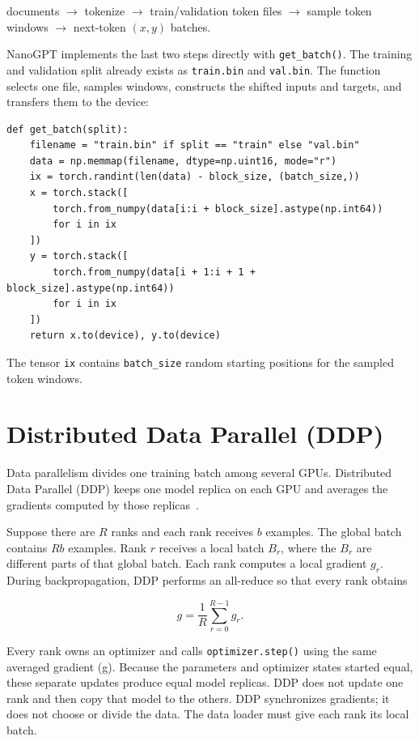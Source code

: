 \documentclass[11pt]{article}
\begin{document}
\begin{center}
documents $\longrightarrow$ tokenize
$\longrightarrow$ train/validation token files
$\longrightarrow$ sample token windows
$\longrightarrow$ next-token $(x,y)$ batches.
\end{center}

NanoGPT implements the last two steps directly with \texttt{get\_batch()}.
The training and validation split already exists as \texttt{train.bin} and
\texttt{val.bin}. The function selects one file, samples windows, constructs
the shifted inputs and targets, and transfers them to the device:

\begin{lstlisting}[basicstyle=\ttfamily\footnotesize]
def get_batch(split):
    filename = "train.bin" if split == "train" else "val.bin"
    data = np.memmap(filename, dtype=np.uint16, mode="r")
    ix = torch.randint(len(data) - block_size, (batch_size,))
    x = torch.stack([
        torch.from_numpy(data[i:i + block_size].astype(np.int64))
        for i in ix
    ])
    y = torch.stack([
        torch.from_numpy(data[i + 1:i + 1 + block_size].astype(np.int64))
        for i in ix
    ])
    return x.to(device), y.to(device)
\end{lstlisting}

The tensor \texttt{ix} contains \texttt{batch\_size} random starting positions
for the sampled token windows.

\newpage
\section{Distributed Data Parallel (DDP)}

Data parallelism divides one training batch among several GPUs. Distributed
Data Parallel (DDP) keeps one model replica on each GPU and averages the
gradients computed by those replicas~\cite{li2020pytorchdistributed}.

Suppose there are $R$ ranks and each rank receives $b$ examples. The
global batch contains $Rb$ examples. Rank $r$ receives a local batch
$B_r$, where the $B_r$ are different parts of that global batch. Each rank
computes a local gradient $g_r$. During backpropagation, DDP performs an
all-reduce so that every rank obtains

\[
g = \frac{1}{R}\sum_{r=0}^{R-1} g_r.
\]

Every rank owns an optimizer and calls \texttt{optimizer.step()} using the
same averaged gradient (g). Because the parameters and optimizer states
started equal, these separate updates produce equal model replicas. DDP does
not update one rank and then copy that model to the others. DDP synchronizes
gradients; it does not choose or divide the data. The data loader must give
each rank its local batch.
\end{document}

